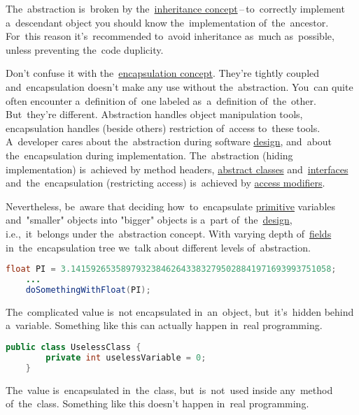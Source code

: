\warning The~abstraction is~broken by the~\hyperref[inheritance]{inheritance concept}\,--\,to~correctly implement a~descendant object you should know the~implementation of~the~ancestor. For~this reason it's~recommended to~avoid inheritance as~much as~possible, unless preventing the~code duplicity.

\warning Don't confuse it with the~\hyperref[encapsulation]{encapsulation concept}. They're tightly coupled and~encapsulation doesn't make any use without the~abstraction. You~can quite often encounter a~definition of~one labeled as~a~definition of~the~other. But~they're different. Abstraction handles object manipulation tools, encapsulation handles (beside others) restriction of~access to~these tools. A~developer cares about the~abstraction during software \hyperref[architecturedesign]{design}, and~about the~encapsulation during implementation. The~abstraction (hiding implementation) is~achieved by method headers, \hyperref[javaabstractclasses]{abstract classes} and~\hyperref[javainterfaces]{interfaces} and~the~encapsulation (restricting access) is~achieved by \hyperref[javaaccessmodifiers]{access modifiers}.

Nevertheless, be~aware that deciding how~to~encapsulate \hyperref[javadatatypes]{primitive} variables and~"smaller" objects into "bigger" objects is a~part of~the~\hyperref[architecturedesign]{design}, i.e.,~it~belongs under the~abstraction concept. With varying depth of~\hyperref[variablefieldproperty]{fields} in~the~encapsulation tree we~talk about different levels of~abstraction.

\begin{lstlisting}[language=Java]
    float PI = 3.1415926535897932384626433832795028841971693993751058;
    ...
    doSomethingWithFloat(PI);
\end{lstlisting}

\noindent The~complicated value is~not encapsulated in~an~object, but~it's~hidden behind a~variable. Something like this can actually happen in~real programming.

\begin{lstlisting}[language=Java]
    public class UselessClass {
        private int uselessVariable = 0;
    }
\end{lstlisting}

\noindent The~value is~encapsulated in~the~class, but~is~not~used inside any~method of~the~class. Something like this doesn't happen in~real programming.

